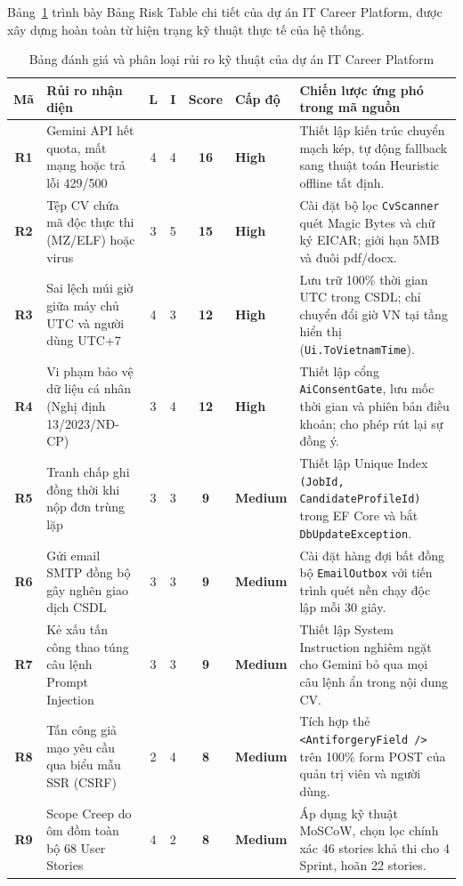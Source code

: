 Bảng~\ref{tab:risk-table} trình bày Bảng Risk Table chi tiết của dự án IT Career Platform, được xây dựng hoàn toàn từ hiện trạng kỹ thuật thực tế của hệ thống.

\begin{table}[htbp]
\centering
\small
\caption{Bảng đánh giá và phân loại rủi ro kỹ thuật của dự án IT Career Platform}
\label{tab:risk-table}
\begin{tabularx}{\textwidth}{c p{3.8cm} c c c l X}
\toprule
\textbf{Mã} & \textbf{Rủi ro nhận diện} & \textbf{L} & \textbf{I} & \textbf{Score} & \textbf{Cấp độ} & \textbf{Chiến lược ứng phó trong mã nguồn} \\
\midrule
\textbf{R1} & Gemini API hết quota, mất mạng hoặc trả lỗi 429/500 & 4 & 4 & \textbf{16} & \textbf{High} & Thiết lập kiến trúc chuyển mạch kép, tự động fallback sang thuật toán Heuristic offline tất định. \\
\addlinespace
\textbf{R2} & Tệp CV chứa mã độc thực thi (MZ/ELF) hoặc virus & 3 & 5 & \textbf{15} & \textbf{High} & Cài đặt bộ lọc \texttt{CvScanner} quét Magic Bytes và chữ ký EICAR; giới hạn 5MB và đuôi pdf/docx. \\
\addlinespace
\textbf{R3} & Sai lệch múi giờ giữa máy chủ UTC và người dùng UTC+7 & 4 & 3 & \textbf{12} & \textbf{High} & Lưu trữ 100\% thời gian UTC trong CSDL; chỉ chuyển đổi giờ VN tại tầng hiển thị (\texttt{Ui.ToVietnamTime}). \\
\addlinespace
\textbf{R4} & Vi phạm bảo vệ dữ liệu cá nhân (Nghị định 13/2023/NĐ-CP) & 3 & 4 & \textbf{12} & \textbf{High} & Thiết lập cổng \texttt{AiConsentGate}, lưu mốc thời gian và phiên bản điều khoản; cho phép rút lại sự đồng ý. \\
\addlinespace
\textbf{R5} & Tranh chấp ghi đồng thời khi nộp đơn trùng lặp & 3 & 3 & \textbf{9} & \textbf{Medium} & Thiết lập Unique Index \texttt{(JobId, CandidateProfileId)} trong EF Core và bắt \texttt{DbUpdateException}. \\
\addlinespace
\textbf{R6} & Gửi email SMTP đồng bộ gây nghẽn giao dịch CSDL & 3 & 3 & \textbf{9} & \textbf{Medium} & Cài đặt hàng đợi bất đồng bộ \texttt{EmailOutbox} với tiến trình quét nền chạy độc lập mỗi 30 giây. \\
\addlinespace
\textbf{R7} & Kẻ xấu tấn công thao túng câu lệnh Prompt Injection & 3 & 3 & \textbf{9} & \textbf{Medium} & Thiết lập System Instruction nghiêm ngặt cho Gemini bỏ qua mọi câu lệnh ẩn trong nội dung CV. \\
\addlinespace
\textbf{R8} & Tấn công giả mạo yêu cầu qua biểu mẫu SSR (CSRF) & 2 & 4 & \textbf{8} & \textbf{Medium} & Tích hợp thẻ \texttt{<AntiforgeryField />} trên 100\% form POST của quản trị viên và người dùng. \\
\addlinespace
\textbf{R9} & Scope Creep do ôm đồm toàn bộ 68 User Stories & 4 & 2 & \textbf{8} & \textbf{Medium} & Áp dụng kỹ thuật MoSCoW, chọn lọc chính xác 46 stories khả thi cho 4 Sprint, hoãn 22 stories. \\
\bottomrule
\end{tabularx}
\end{table}

